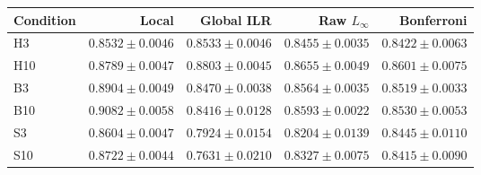 \begin{tabular}{lrrrr}
\toprule
Condition & Local & Global ILR & Raw $L_\infty$ & Bonferroni\\
\midrule
H3 & $0.8532\pm0.0046$ & $0.8533\pm0.0046$ & $0.8455\pm0.0035$ & $0.8422\pm0.0063$\\
H10 & $0.8789\pm0.0047$ & $0.8803\pm0.0045$ & $0.8655\pm0.0049$ & $0.8601\pm0.0075$\\
B3 & $0.8904\pm0.0049$ & $0.8470\pm0.0038$ & $0.8564\pm0.0035$ & $0.8519\pm0.0033$\\
B10 & $0.9082\pm0.0058$ & $0.8416\pm0.0128$ & $0.8593\pm0.0022$ & $0.8530\pm0.0053$\\
S3 & $0.8604\pm0.0047$ & $0.7924\pm0.0154$ & $0.8204\pm0.0139$ & $0.8445\pm0.0110$\\
S10 & $0.8722\pm0.0044$ & $0.7631\pm0.0210$ & $0.8327\pm0.0075$ & $0.8415\pm0.0090$\\
\bottomrule
\end{tabular}
